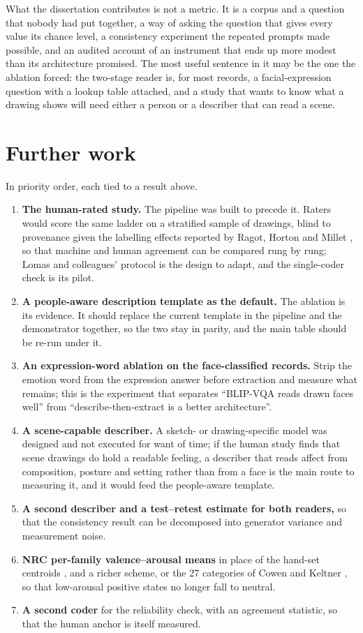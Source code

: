 What the dissertation contributes is not a metric. It is a corpus and a question that nobody had put together, a way of asking the question that gives every value its chance level, a consistency experiment the repeated prompts made possible, and an audited account of an instrument that ends up more modest than its architecture promised. The most useful sentence in it may be the one the ablation forced: the two-stage reader is, for most records, a facial-expression question with a lookup table attached, and a study that wants to know what a drawing shows will need either a person or a describer that can read a scene.

\section{Further work}
\label{sec:further}

In priority order, each tied to a result above.

\begin{enumerate}\setlength{\itemsep}{2pt}
\item \textbf{The human-rated study.} The pipeline was built to precede it. Raters would score the same ladder on a stratified sample of drawings, blind to provenance given the labelling effects reported by Ragot, Horton and Millet \cite{ragot2020ai, horton2023bias, millet2023defending}, so that machine and human agreement can be compared rung by rung; Lomas and colleagues' protocol \cite{lomas2024improved} is the design to adapt, and the single-coder check is its pilot.
\item \textbf{A people-aware description template as the default.} The ablation is its evidence. It should replace the current template in the pipeline and the demonstrator together, so the two stay in parity, and the main table should be re-run under it.
\item \textbf{An expression-word ablation on the face-classified records.} Strip the emotion word from the expression answer before extraction and measure what remains; this is the experiment that separates ``BLIP-VQA reads drawn faces well'' from ``describe-then-extract is a better architecture''.
\item \textbf{A scene-capable describer.} A sketch- or drawing-specific model was designed and not executed for want of time; if the human study finds that scene drawings do hold a readable feeling, a describer that reads affect from composition, posture and setting rather than from a face is the main route to measuring it, and it would feed the people-aware template.
\item \textbf{A second describer and a test--retest estimate for both readers,} so that the consistency result can be decomposed into generator variance and measurement noise.
\item \textbf{NRC per-family valence--arousal means} in place of the hand-set centroids \cite{mohammad2018obtaining}, and a richer scheme, or the 27 categories of Cowen and Keltner \cite{cowen2017self}, so that low-arousal positive states no longer fall to neutral.
\item \textbf{A second coder} for the reliability check, with an agreement statistic, so that the human anchor is itself measured.
\end{enumerate}
